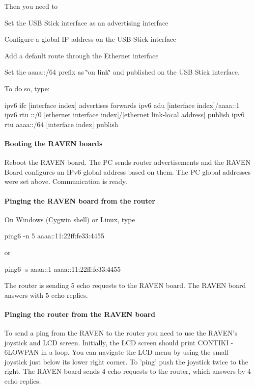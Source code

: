 \-Then you need to \begin{DoxyItemize}
\item \-Set the \-U\-S\-B \-Stick interface as an advertising interface \item \-Configure a global \-I\-P address on the \-U\-S\-B \-Stick interface \item \-Add a default route through the \-Ethernet interface \item \-Set the aaaa\-:\-:/64 prefix as \char`\"{}on link\char`\"{} and published on the \-U\-S\-B \-Stick interface.\end{DoxyItemize}
\-To do so, type\-: 
\begin{DoxyCode}
ipv6 ifc [interface index] advertises forwards
ipv6 adu [interface index]/aaaa::1
ipv6 rtu ::/0 [ethernet interface index]/[ethernet link-local address] publish
ipv6 rtu aaaa::/64 [interface index] publish
\end{DoxyCode}
\hypertarget{a00058_running_raven}{}\paragraph{\-Booting the R\-A\-V\-E\-N boards}\label{a00058_running_raven}
\-Reboot the \-R\-A\-V\-E\-N board. \-The \-P\-C sends router advertisements and the \-R\-A\-V\-E\-N \-Board configures an \-I\-Pv6 global address based on them. \-The \-P\-C global addresses were set above. \-Communication is ready.\hypertarget{a00058_running_ping1}{}\paragraph{\-Pinging the R\-A\-V\-E\-N board from the router}\label{a00058_running_ping1}
\-On \-Windows (\-Cygwin shell) or \-Linux, type \begin{DoxyVerb}
ping6 -n 5 aaaa::11:22ff:fe33:4455
\end{DoxyVerb}
 or \begin{DoxyVerb}
ping6 -s aaaa::1 aaaa::11:22ff:fe33:4455
\end{DoxyVerb}
 \-The router is sending 5 echo requests to the \-R\-A\-V\-E\-N board. \-The \-R\-A\-V\-E\-N board answers with 5 echo replies.\hypertarget{a00058_running_ping2}{}\paragraph{\-Pinging the router from the R\-A\-V\-E\-N board}\label{a00058_running_ping2}
\-To send a ping from the \-R\-A\-V\-E\-N to the router you need to use the \-R\-A\-V\-E\-N's joystick and \-L\-C\-D screen. \-Initially, the \-L\-C\-D screen should print \-C\-O\-N\-T\-I\-K\-I -\/ 6\-L\-O\-W\-P\-A\-N in a loop. \-You can navigate the \-L\-C\-D menu by using the small joystick just below its lower right corner. \-To 'ping' push the joystick twice to the right. \-The \-R\-A\-V\-E\-N board sends 4 echo requests to the router, which answers by 4 echo replies.\par
